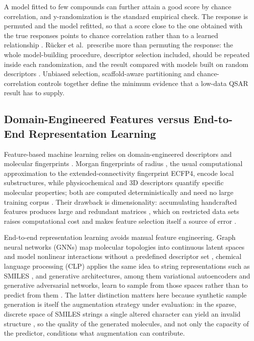 A model fitted to few compounds can further attain a good score by chance correlation, and y-randomization is the
standard empirical check. The response is permuted and the model refitted, so that a score close to the one obtained
with the true responses points to chance correlation rather than to a learned relationship \citep{rucker2007}. R\"ucker
et al.\ prescribe more than permuting the response: the whole model-building procedure, descriptor selection included,
should be repeated inside each randomization, and the result compared with models built on random descriptors
\citep{rucker2007}. Unbiased selection, scaffold-aware partitioning and chance-correlation controls together define
the minimum evidence that a low-data QSAR result has to supply.

\subsection{Domain-Engineered Features versus End-to-End Representation Learning}

Feature-based machine learning relies on domain-engineered descriptors and molecular fingerprints \citep{rajesh2026}.
Morgan fingerprints of radius \MorganRadius, the usual computational approximation to the extended-connectivity fingerprint ECFP4,
encode local substructures, while physicochemical and 3D descriptors quantify specific molecular properties; both are
computed deterministically and need no large training corpus \citep{avantika2025, beatrice2026, xiewt2023}. Their
drawback is dimensionality: accumulating handcrafted features produces large and redundant matrices \citep{godarzi2013,
hadas2023}, which on restricted data sets raises computational cost and makes feature selection itself a source of
error \citep{godarzi2013, hadas2023}.

End-to-end representation learning avoids manual feature engineering. Graph neural networks (GNNs) map molecular
topologies into continuous latent spaces and model nonlinear interactions without a predefined descriptor set
\citep{abul2026, rajesh2026}, chemical language processing (CLP) applies the same idea to string representations such
as SMILES \citep{riza2025}, and generative architectures, among them variational autoencoders and generative
adversarial networks, learn to sample from those spaces rather than to predict from them \citep{yifan2023}. The latter
distinction matters here because synthetic sample generation is itself the augmentation strategy under evaluation: in
the sparse, discrete space of SMILES strings a single altered character can yield an invalid structure
\citep{yifan2023}, so the quality of the generated molecules, and not only the capacity of the predictor, conditions
what augmentation can contribute.

